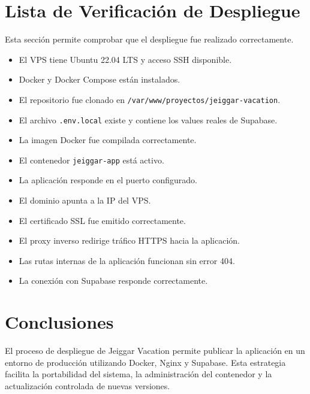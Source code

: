 \documentclass[12pt,letterpaper]{article}
\newcommand{\code}[1]{\nolinkurl{#1}}
\begin{document}
\section{Lista de Verificación de Despliegue}

Esta sección permite comprobar que el despliegue fue realizado correctamente.

\begin{itemize}
\item[$\square$] El VPS tiene Ubuntu 22.04 LTS y acceso SSH disponible.
\item[$\square$] Docker y Docker Compose están instalados.
\item[$\square$] El repositorio fue clonado en \code{/var/www/proyectos/jeiggar-vacation}.
\item[$\square$] El archivo \code{.env.local} existe y contiene los values reales de Supabase.
\item[$\square$] La imagen Docker fue compilada correctamente.
\item[$\square$] El contenedor \code{jeiggar-app} está activo.
\item[$\square$] La aplicación responde en el puerto configurado.
\item[$\square$] El dominio apunta a la IP del VPS.
\item[$\square$] El certificado SSL fue emitido correctamente.
\item[$\square$] El proxy inverso redirige tráfico HTTPS hacia la aplicación.
\item[$\square$] Las rutas internas de la aplicación funcionan sin error 404.
\item[$\square$] La conexión con Supabase responde correctamente.
\end{itemize}

\section{Conclusiones}

El proceso de despliegue de Jeiggar Vacation permite publicar la aplicación en un entorno de producción utilizando Docker, Nginx y Supabase. Esta estrategia facilita la portabilidad del sistema, la administración del contenedor y la actualización controlada de nuevas versiones.
\end{document}
